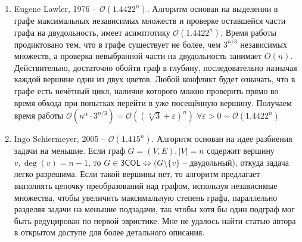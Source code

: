 \documentclass{article}
\begin{document}
\begin{enumerate}
\item Eugene Lawler, 1976\cite{1} -- $\mathcal{O}(1.4422^n)$.
\newline
Алгоритм основан на выделении в графе максимальных независимых множеств и проверке оставшейся части графа на двудольность,
имеет асимптотику $\mathcal{O}(1.4422^n)$. Время работы продиктовано тем, что в графе существует не более, чем $3^{n/3}$ независимых множеств\cite{6}, а проверка невыбранной
части на двудольность занимает $O(n)$. Действительно, достаточно обойти граф в глубину, последовательно назначая каждой вершине один из двух цветов.
Любой конфликт будет означать, что в графе есть нечётный цикл, наличие которого можно проверить прямо во время обхода при попытках перейти в уже посещённую вершину.
Получаем время работы $\mathcal{O}(n^{\alpha}\cdot 3^{n/3}) = \mathcal{O}((\sqrt[3]{3} + \varepsilon)^n)\;\forall \varepsilon > 0 \sim \mathcal{O}(1.4422^n)$

\item Ingo Schiermeyer, 2005\cite{2} -- $\mathcal{O}(1.415^n)$.
\newline
Алгоритм основан на идее разбиения задачи на меньшие.
Если граф $G=(V, E), |V|=n$ содержит вершину $v, \deg(v)=n-1$, то $G\in\mathsf{3COL} \Leftrightarrow (G\setminus\{v\}$ -- двудольный), откуда задача легко разрешима.
Если такой вершины нет, то алгоритм предлагает выполнять цепочку преобразований над графом, используя независимые множества, чтобы увеличить максимальную степень графа,
параллельно разделяя задачи на меньшие подзадачи, так чтобы хотя бы один подграф мог быть редуцирован по первой эвристике. Мне не удалось найти статью автора в открытом доступе
для более детального описания.


\end{enumerate}
\end{document}
